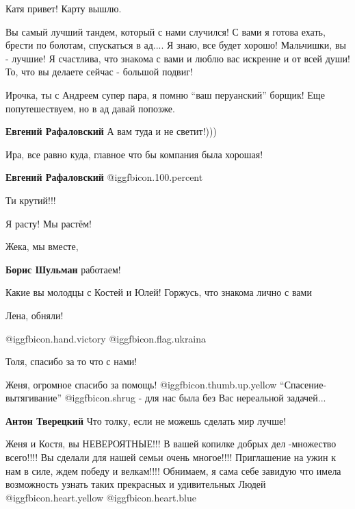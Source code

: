 \begin{itemize}
Катя привет! Карту вышлю.


Вы самый лучший тандем, который с нами случился! С вами я готова ехать, брести по
болотам, спускаться в ад.... Я знаю, все будет хорошо! Мальчишки, вы - лучшие! Я
счастлива, что знакома с вами и люблю вас искренне и от всей души! То, что вы
делаете сейчас - большой подвиг!

\begin{itemize} %
Ирочка, ты с Андреем супер пара, я помню \enquote{ваш перуанский} борщик! Еще попутешествуем, но в ад давай попозже.

\textbf{Евгений Рафаловский} А вам туда и не светит!)))

Ира, все равно куда, главное что бы компания была хорошая!

\textbf{Евгений Рафаловский}  @igg{fbicon.100.percent} 
\end{itemize} %

Ти крутий!!!

Я расту! Мы растём!

Жека, мы вместе,

\textbf{Борис Шульман} работаем!

Какие вы молодцы с Костей и Юлей! Горжусь, что знакома лично с вами

Лена, обняли!

@igg{fbicon.hand.victory} @igg{fbicon.flag.ukraina}

Толя, спасибо за то что с нами!

Женя,
огромное спасибо за помощь! @igg{fbicon.thumb.up.yellow} 
\enquote{Спасение-вытягивание}  @igg{fbicon.shrug}  - для нас была без Вас нереальной задачей...

\textbf{Антон Тверецкий} Что толку, если не можешь сделать мир лучше!


Женя и Костя, вы НЕВЕРОЯТНЫЕ!!! В вашей копилке добрых дел -множество всего!!!!
Вы сделали для нашей семьи очень многое!!!! Приглашение на ужин к нам в силе,
ждем победу и велкам!!!! Обнимаем, я сама себе завидую что имела возможность
узнать таких прекрасных и удивительных Людей @igg{fbicon.heart.yellow}  @igg{fbicon.heart.blue} 


\end{itemize}
